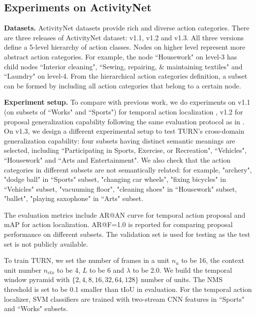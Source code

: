 \documentclass[10pt,twocolumn,letterpaper]{article}
\begin{document}
\vspace{-1.5mm}
\subsection{Experiments on ActivityNet}
\textbf{Datasets.} ActivityNet datasets provide rich and diverse action categories. There are three releases of ActivityNet dataset: v1.1, v1.2 and v1.3.
All three versions define a 5-level hierarchy of action classes. Nodes on higher level represent more abstract action categories. For example, the node ``Housework" on level-3 has child nodes ``Interior cleaning", ``Sewing, repairing, \& maintaining textiles" and ``Laundry" on level-4. From the hierarchical action categories definition, a subset can be formed by including all action categories that belong to a certain node.

\textbf{Experiment setup.} 
To compare with previous work, we do experiments on v1.1 (on subsets of ``Works" and ``Sports") for temporal action localization \cite{caba2015activitynet, Yeung_2016_CVPR}, v1.2 for proposal generalization capability following  the same evaluation protocol as in \cite{escorcia2016daps}. On v1.3, we design a different experimental setup to test TURN's cross-domain generalization capability: four subsets having distinct semantic meanings are selected, including ``Participating in Sports, Exercise, or Recreation", ``Vehicles", ``Housework" and ``Arts and Entertainment". We also check that the action categories in different subsets are not semantically related: for example, "archery", "dodge ball" in ``Sports" subset, "changing car wheels", "fixing bicycles" in ``Vehicles" subset, "vacuuming floor", "cleaning shoes" in ``Housework" subset, "ballet", "playing saxophone" in ``Arts" subset. 



The evaluation metrics include AR@AN curve for temporal action proposal and mAP for action localization. AR@F=1.0 is reported for comparing proposal performance on different subsets. The validation set is used for testing as the test set is not publicly available.

To train TURN, we set the number of frames in a unit $n_u$ to be 16, the context unit number $n_{ctx}$ to be 4, $L$ to be 6 and $\lambda$ to be 2.0. We build the temporal window pyramid with $\{2,4,8,16,32,64,128\}$ number of units. The NMS threshold is set to be 0.1 smaller than tIoU in evaluation. For the temporal action localizer, SVM classifiers are trained with two-stream CNN features in ``Sports"  and ``Works" subsets.
\end{document}
